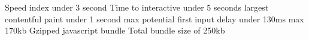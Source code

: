 Speed index under 3 second
Time to interactive under 5 seconds
largest contentful paint under 1 second
max potential first input delay under 130ms
max 170kb Gzipped javascript bundle 
Total bundle size of 250kb 
